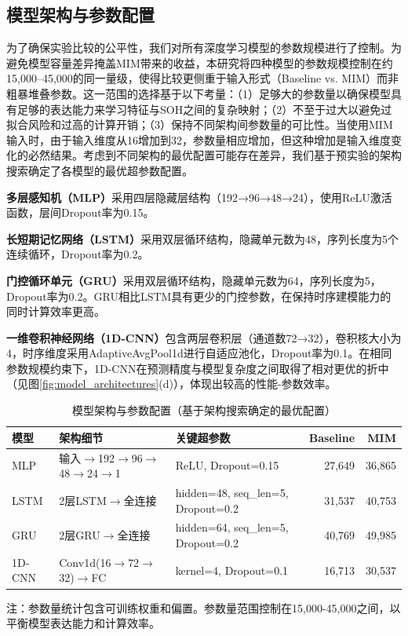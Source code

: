 \documentclass[10pt,a4paper]{ctexart}
\begin{document}
\subsection{模型架构与参数配置}

为了确保实验比较的公平性，我们对所有深度学习模型的参数规模进行了控制。为避免模型容量差异掩盖MIM带来的收益，本研究将四种模型的参数规模控制在约15,000–45,000的同一量级，使得比较更侧重于输入形式（Baseline vs. MIM）而非粗暴堆叠参数。这一范围的选择基于以下考量：（1）足够大的参数量以确保模型具有足够的表达能力来学习特征与SOH之间的复杂映射；（2）不至于过大以避免过拟合风险和过高的计算开销；（3）保持不同架构间参数量的可比性。当使用MIM输入时，由于输入维度从16增加到32，参数量相应增加，但这种增加是输入维度变化的必然结果。考虑到不同架构的最优配置可能存在差异，我们基于预实验的架构搜索确定了各模型的最优超参数配置。

\textbf{多层感知机（MLP）}采用四层隐藏层结构（192→96→48→24），使用ReLU激活函数，层间Dropout率为0.15。

\textbf{长短期记忆网络（LSTM）}采用双层循环结构，隐藏单元数为48，序列长度为5个连续循环，Dropout率为0.2。

\textbf{门控循环单元（GRU）}采用双层循环结构，隐藏单元数为64，序列长度为5，Dropout率为0.2。GRU相比LSTM具有更少的门控参数，在保持时序建模能力的同时计算效率更高。

\textbf{一维卷积神经网络（1D-CNN）}包含两层卷积层（通道数72→32），卷积核大小为4，时序维度采用AdaptiveAvgPool1d进行自适应池化，Dropout率为0.1。在相同参数规模约束下，1D-CNN在预测精度与模型复杂度之间取得了相对更优的折中（见图\ref{fig:model_architectures}(d)），体现出较高的性能-参数效率。

\begin{table}[H]
\centering
\caption{模型架构与参数配置（基于架构搜索确定的最优配置）}
\label{tab:model_config}
\begin{threeparttable}
\begin{tabular}{@{}llp{5cm}rr@{}}
\toprule
\textbf{模型} & \textbf{架构细节} & \textbf{关键超参数} & \textbf{Baseline} & \textbf{MIM} \\
\midrule
MLP & 输入$\rightarrow$192$\rightarrow$96$\rightarrow$48$\rightarrow$24$\rightarrow$1 & ReLU, Dropout=0.15 & 27,649 & 36,865 \\
LSTM & 2层LSTM$\rightarrow$全连接 & hidden=48, seq\_len=5, Dropout=0.2 & 31,537 & 40,753 \\
GRU & 2层GRU$\rightarrow$全连接 & hidden=64, seq\_len=5, Dropout=0.2 & 40,769 & 49,985 \\
1D-CNN & Conv1d(16$\rightarrow$72$\rightarrow$32)$\rightarrow$FC & kernel=4, Dropout=0.1 & 16,713 & 30,537 \\
\bottomrule
\end{tabular}
\begin{tablenotes}
    \item 注：参数量统计包含可训练权重和偏置。参数量范围控制在15,000-45,000之间，以平衡模型表达能力和计算效率。
\end{tablenotes}
\end{threeparttable}
\end{table}
\end{document}
